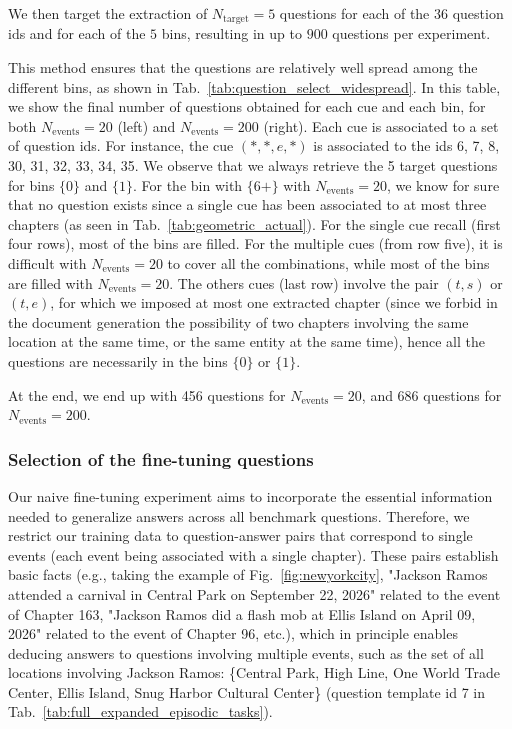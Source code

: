 \documentclass{article}
\begin{document}
We then target the extraction of $N_{\text{target}} = 5$ questions for each of the $36$ question $\text{id}$s and for each of the $5$ bins, resulting in up to $900$ questions per experiment.

This method ensures that the questions are relatively well spread among the different bins, as shown in Tab.~\ref{tab:question_select_widespread}. In this table, we show the final number of questions obtained for each cue and each bin, for both $N_{\text{events}} = 20$ (left) and $N_{\text{events}} = 200$ (right). Each cue is associated to a set of question ids. For instance, the cue $(*,*,e,*)$ is associated to the ids 6, 7, 8, 30, 31, 32, 33, 34, 35. 
We observe that we always retrieve the 5 target questions for bins $\lbrace 0 \rbrace$ and $\lbrace 1 \rbrace$. For the bin with $\lbrace 6+ \rbrace$ with $N_{\text{events}} = 20$, we know for sure that no question exists since a single cue has been associated to at most three chapters (as seen in Tab.~\ref{tab:geometric_actual}).
For the single cue recall (first four rows), most of the bins are filled. 
For the multiple cues (from row five), it is difficult with $N_{\text{events}} = 20$ to cover all the combinations, while most of the bins are filled with $N_{\text{events}} = 20$.
The others cues (last row) involve the pair $(t,s)$ or $(t,e)$, for which we imposed at most one extracted chapter (since we forbid in the document generation the possibility of two chapters involving the same location at the same time, or the same entity at the same time), hence all the questions are necessarily in the bins $\lbrace 0 \rbrace$ or $\lbrace 1 \rbrace$.


At the end, we end up with 456 questions for $N_{\text{events}} = 20$, and 686 questions for $N_{\text{events}} = 200$.

\subsubsection{Selection of the fine-tuning questions}\label{app:question_ftuning}

Our naive fine-tuning experiment aims to incorporate the essential information needed to generalize answers across all benchmark questions. 
Therefore, we restrict our training data to question-answer pairs that correspond to single events (each event being associated with a single chapter). %
These pairs establish basic facts (e.g., taking the example of Fig.~\ref{fig:newyorkcity}, "Jackson Ramos attended a carnival in Central Park on September 22, 2026" related to the event of Chapter 163, "Jackson Ramos did a flash mob at Ellis Island on April 09, 2026" related to the event of Chapter 96, etc.), which in principle enables deducing answers to questions involving multiple events, such as the set of all locations involving Jackson Ramos: \{Central Park, High Line, One World Trade Center, Ellis Island, Snug Harbor Cultural Center\} (question template id 7 in Tab.~\ref{tab:full_expanded_episodic_tasks}).
\end{document}
